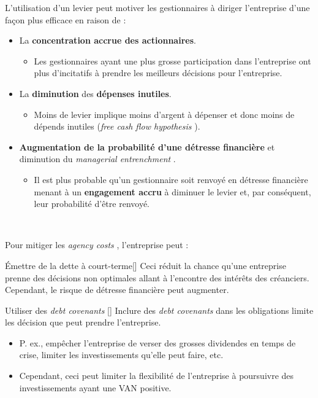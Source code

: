 \documentclass[10pt, french]{article}
\begin{document}
\begin{multicols*}{2}
L'utilisation d'un levier peut motiver les gestionnaires à diriger l'entreprise d'une façon plus efficace en raison de : 
\begin{itemize}
	\item	La \textbf{concentration accrue des actionnaires}.
		\begin{itemize}
		\item	Les gestionnaires ayant une plus grosse participation dans l'entreprise ont plus d'incitatifs à prendre les meilleurs décisions pour l'entreprise.
		\end{itemize}
	\item	La \textbf{diminution} des \textbf{dépenses inutiles}.
		\begin{itemize}
		\item	Moins de levier implique moins d'argent à dépenser et donc moins de dépends inutiles (\og \textit{free cash flow hypothesis} \fg{}).
		\end{itemize}
	\item	\textbf{Augmentation de la probabilité d'une détresse financière} et diminution du \og \textit{managerial entrenchment} \fg{}.
		\begin{itemize}
		\item	Il est plus probable qu'un gestionnaire soit renvoyé en détresse financière menant à un \textbf{engagement accru} à diminuer le levier et, par conséquent, leur probabilité d'être renvoyé.
		\end{itemize}
\end{itemize}

\

Pour mitiger les \og \textit{agency costs} \fg{}, l'entreprise peut : 
\begin{definitionGENERAL}{Émettre de la dette à court-terme}[]
Ceci réduit la chance qu'une entreprise prenne des décisions non optimales allant à l'encontre des intérêts des créanciers. Cependant, le risque de détresse financière peut augmenter.
\end{definitionGENERAL}

\begin{definitionGENERAL}{Utiliser des \og \textit{debt covenants} \fg{}}[]
Inclure des \og \textit{debt covenants} \fg{} dans les obligations limite les décision que peut prendre l'entreprise.
\begin{itemize}
	\item	P. ex., empêcher l'entreprise de verser des grosses dividendes en temps de crise, limiter les investissements qu'elle peut faire, etc.
	\item	Cependant, ceci peut limiter la flexibilité de l'entreprise à poursuivre des investissements ayant une VAN positive.
\end{itemize}
\end{definitionGENERAL}



\end{multicols*}
\end{document}
